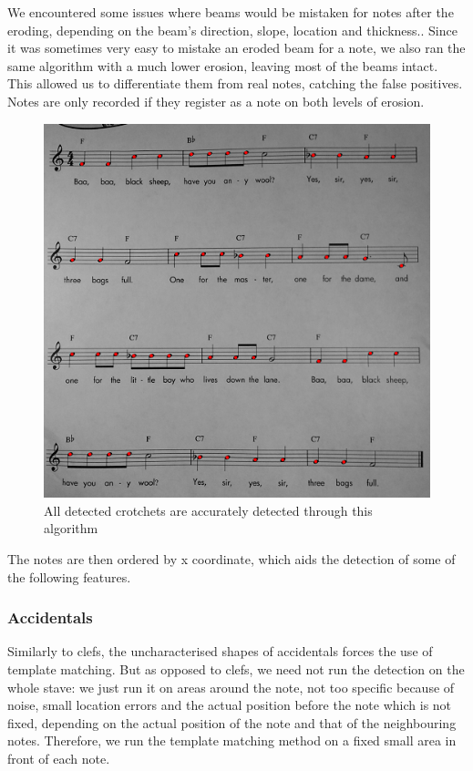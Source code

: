 We encountered some issues where beams would be mistaken for notes after the eroding, depending on the beam’s direction, slope, location and thickness.. Since it was sometimes very easy to mistake an eroded beam for a note, we also ran the same algorithm with a much lower erosion, leaving most of the beams intact. This allowed us to differentiate them from real notes,
catching the false positives. Notes are only recorded if they register as a note on both levels of erosion.

\begin{figure}[ht!]
    \centering
    \includegraphics[width=1\textwidth]{./assets/crotchetsdetected.png}
    \caption{All detected crotchets are accurately detected through this algorithm}
    \label{image:crotchetsdetected}
\end{figure}

The notes are then ordered by x coordinate, which aids the detection of some of the following features.

\subsubsection{Accidentals}

Similarly to clefs, the uncharacterised shapes of accidentals forces the use of template matching. But as opposed to clefs, we need not run the detection on the whole stave: we just run it on areas around the note, not too specific because of noise, small location errors and the actual position before the note which is not fixed, depending on the actual
position of the note and that of the neighbouring notes. Therefore, we run the template matching method on a fixed small area in front of each note.

